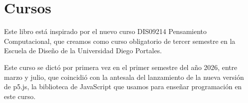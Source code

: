 \documentclass[../principal.tex]{subfiles}
\begin{document}
\chapter{Cursos}

Este libro está inspirado por el nuevo curso DIS09214 Pensamiento Computacional, que creamos como curso obligatorio de tercer semestre en la Escuela de Diseño de la Universidad Diego Portales.

Este curso se dictó por primera vez en el primer semestre del año 2026, entre marzo y julio, que coincidió con la antesala del lanzamiento de la nueva versión de p5.js, la biblioteca de JavaScript que usamos para enseñar programación en este curso.

\newpage
\end{document}
